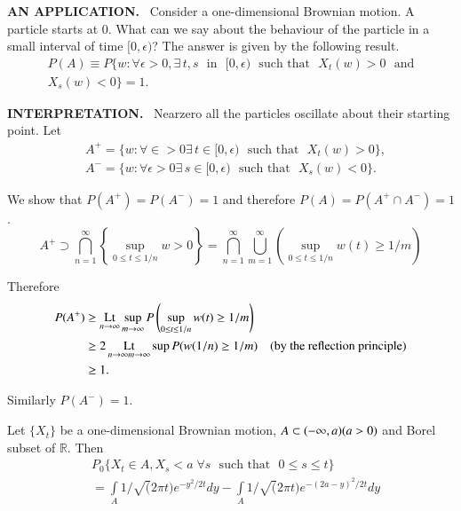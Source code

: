 \noindent
{\bf AN APPLICATION.}~ Consider a one-dimensional Brownian motion. A
particle starts at $0$. What can we say about the behaviour of the
particle in a small interval of time $[0,\epsilon)$? The answer is
  given by the following result.
\begin{gather*}
P(A)\equiv P\{w:\forall \epsilon>0,\exists\, t,s\text{~ in~ }
[0,\epsilon)\text{~ such that~ }X_{t}(w)>0\text{~ and}\\
X_{s}(w)<0\}=1.
\end{gather*}

\noindent
{\bf INTERPRETATION.}~ Near\pageoriginale zero all the particles
oscillate about their starting point. Let
\begin{align*}
& A^{+}=\{w:\forall \in >0\exists\, t\in [0,\epsilon)\text{~ such that~
    }X_{t}(w)>0\},\\
& A^{-}=\{w:\forall \epsilon>0\exists\, s\in [0,\epsilon)\text{~ such
        that~ }X_{s}(w)<0\}.
\end{align*}

We show that $P(A^{+})=P(A^{-})=1$ and therefore $P(A)=P(A^{+}\cap
A^{-})=1$.
$$
A^{+}\supset \bigcap^{\infty}_{n=1}\left\{\sup\limits_{0\leq t\leq
  1/n}w>0\right\}=\bigcap^{\infty}_{n=1}\bigcup^{\infty}_{m=1}\left(\sup\limits_{0\leq
  t\leq 1/n}w(t)\geq 1/m\right)
$$

Therefore
\begin{align*}
P(A^{+}) &\geq \operatorname*{Lt}\limits_{n\to \infty}\sup\limits_{m\to
  \infty}P\left(\sup\limits_{0\leq t\leq 1/n}w(t)\geq 1/m\right)\\
&\geq 2\operatorname*{Lt}\limits_{n\to \infty m\to \infty}\sup P(w(1/n)\geq 1/m)\quad
\text{(by the reflection principle)}\\
&\geq 1.
\end{align*}

Similarly $P(A^{-})=1$.

\begin{theorem*}
Let $\{X_{t}\}$ be a one-dimensional Brownian motion, $A\subset
(-\infty,a)\break (a>0)$ and Borel subset of $\mathbb{R}$. Then
\begin{align*}
& P_{0}\{X_{t}\in A,X_{s}<a\;\forall s\text{~ such that~ }0\leq s\leq
t\}\\
&= \int\limits_{A}1/\surd(2\pi
t)e^{-y^{2}/2t}dy-\int\limits_{A}1/\surd(2\pi t)e^{-(2a-y)^{2}/2t}dy
\end{align*}
\end{theorem*}

